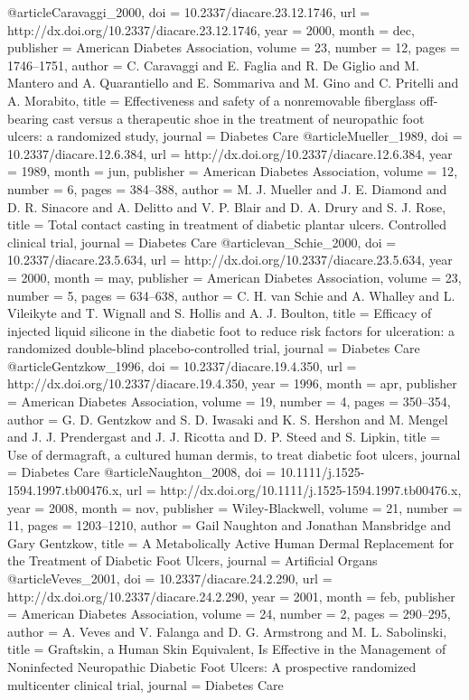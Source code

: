 @article{Caravaggi_2000,
	doi = {10.2337/diacare.23.12.1746},
	url = {http://dx.doi.org/10.2337/diacare.23.12.1746},
	year = 2000,
	month = {dec},
	publisher = {American Diabetes Association},
	volume = {23},
	number = {12},
	pages = {1746--1751},
	author = {C. Caravaggi and E. Faglia and R. De Giglio and M. Mantero and A. Quarantiello and E. Sommariva and M. Gino and C. Pritelli and A. Morabito},
	title = {Effectiveness and safety of a nonremovable fiberglass off-bearing cast versus a therapeutic shoe in the treatment of neuropathic foot ulcers: a randomized study},
	journal = {Diabetes Care}
}
@article{Mueller_1989,
	doi = {10.2337/diacare.12.6.384},
	url = {http://dx.doi.org/10.2337/diacare.12.6.384},
	year = 1989,
	month = {jun},
	publisher = {American Diabetes Association},
	volume = {12},
	number = {6},
	pages = {384--388},
	author = {M. J. Mueller and J. E. Diamond and D. R. Sinacore and A. Delitto and V. P. Blair and D. A. Drury and S. J. Rose},
	title = {Total contact casting in treatment of diabetic plantar ulcers. Controlled clinical trial},
	journal = {Diabetes Care}
}
@article{van_Schie_2000,
	doi = {10.2337/diacare.23.5.634},
	url = {http://dx.doi.org/10.2337/diacare.23.5.634},
	year = 2000,
	month = {may},
	publisher = {American Diabetes Association},
	volume = {23},
	number = {5},
	pages = {634--638},
	author = {C. H. van Schie and A. Whalley and L. Vileikyte and T. Wignall and S. Hollis and A. J. Boulton},
	title = {Efficacy of injected liquid silicone in the diabetic foot to reduce risk factors for ulceration: a randomized double-blind placebo-controlled trial},
	journal = {Diabetes Care}
}
@article{Gentzkow_1996,
	doi = {10.2337/diacare.19.4.350},
	url = {http://dx.doi.org/10.2337/diacare.19.4.350},
	year = 1996,
	month = {apr},
	publisher = {American Diabetes Association},
	volume = {19},
	number = {4},
	pages = {350--354},
	author = {G. D. Gentzkow and S. D. Iwasaki and K. S. Hershon and M. Mengel and J. J. Prendergast and J. J. Ricotta and D. P. Steed and S. Lipkin},
	title = {Use of dermagraft, a cultured human dermis, to treat diabetic foot ulcers},
	journal = {Diabetes Care}
}
@article{Naughton_2008,
	doi = {10.1111/j.1525-1594.1997.tb00476.x},
	url = {http://dx.doi.org/10.1111/j.1525-1594.1997.tb00476.x},
	year = 2008,
	month = {nov},
	publisher = {Wiley-Blackwell},
	volume = {21},
	number = {11},
	pages = {1203--1210},
	author = {Gail Naughton and Jonathan Mansbridge and Gary Gentzkow},
	title = {A Metabolically Active Human Dermal Replacement for the Treatment of Diabetic Foot Ulcers},
	journal = {Artificial Organs}
}
@article{Veves_2001,
	doi = {10.2337/diacare.24.2.290},
	url = {http://dx.doi.org/10.2337/diacare.24.2.290},
	year = 2001,
	month = {feb},
	publisher = {American Diabetes Association},
	volume = {24},
	number = {2},
	pages = {290--295},
	author = {A. Veves and V. Falanga and D. G. Armstrong and M. L. Sabolinski},
	title = {Graftskin, a Human Skin Equivalent, Is Effective in the Management of Noninfected Neuropathic Diabetic Foot Ulcers: A prospective randomized multicenter clinical trial},
	journal = {Diabetes Care}
}
